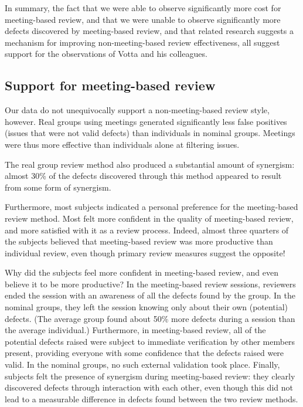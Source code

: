 In summary, the fact that we were able to observe significantly more cost for
meeting-based review, and that we were unable to observe significantly more
defects discovered by meeting-based review, and that related research
suggests a mechanism for improving non-meeting-based review effectiveness, 
all suggest support for the observations of Votta and his colleagues.

\subsection{Support for meeting-based review}

Our data do not unequivocally support a non-meeting-based review style,
however. Real groups using meetings generated significantly less false
positives (issues that were not valid defects) than individuals in nominal
groups. Meetings were thus more effective than individuals alone at
filtering issues.

The real group review method also produced a substantial amount of synergism:
almost 30\% of the defects discovered through this method appeared to
result from some form of synergism.

Furthermore, most subjects indicated a personal preference for the
meeting-based review method. Most felt more confident in the quality of
meeting-based review, and more satisfied with it as a review process.
Indeed, almost three quarters of the subjects believed that meeting-based
review was more productive than individual review, even though primary
review measures suggest the opposite!

Why did the subjects feel more confident in meeting-based review, and even
believe it to be more productive?  In the meeting-based review sessions,
reviewers ended the session with an awareness of all the defects found by
the group.  In the nominal groups, they left the session knowing only about
their own (potential) defects. (The average group found about 50\% more
defects during a session than the average individual.)  Furthermore, in
meeting-based review, all of the potential defects raised were subject to
immediate verification by other members present, providing everyone with
some confidence that the defects raised were valid. In the nominal groups,
no such external validation took place.  Finally, subjects felt the
presence of synergism during meeting-based review: they clearly discovered
defects through interaction with each other, even though this did not lead
to a measurable difference in defects found between the two review methods.

